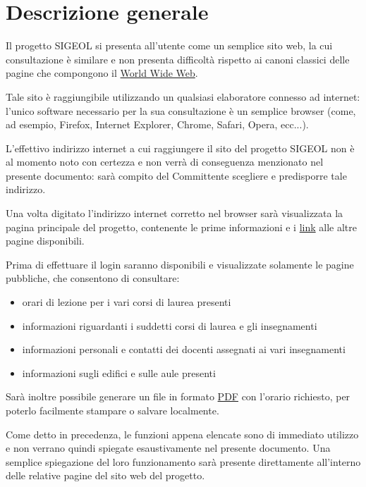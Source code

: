 \documentclass[11pt,a4paper]{article}
\begin{document}
\section{Descrizione generale}
Il progetto SIGEOL si presenta all'utente come un semplice sito web, la cui consultazione è similare e non presenta difficoltà rispetto ai canoni classici delle pagine che compongono il \underline{World Wide Web}.

Tale sito è raggiungibile utilizzando un qualsiasi elaboratore connesso ad internet: l'unico software necessario per la sua consultazione è un semplice browser (come, ad esempio, Firefox, Internet Explorer, Chrome, Safari, Opera, ecc...).

L'effettivo indirizzo internet a cui raggiungere il sito del progetto SIGEOL non è al momento noto con certezza e non verrà di conseguenza menzionato nel presente documento: sarà compito del Committente scegliere e predisporre tale indirizzo.

Una volta digitato l'indirizzo internet corretto nel browser sarà visualizzata la pagina principale del progetto, contenente le prime informazioni e i \underline{link} alle altre pagine disponibili.

Prima di effettuare il login saranno disponibili e visualizzate solamente le pagine pubbliche, che consentono di consultare:
\begin{itemize}
 \item orari di lezione per i vari corsi di laurea presenti
 \item informazioni riguardanti i suddetti corsi di laurea e gli insegnamenti
 \item informazioni personali e contatti dei docenti assegnati ai vari insegnamenti
 \item informazioni sugli edifici e sulle aule presenti
\end{itemize}
Sarà inoltre possibile generare un file in formato \underline{PDF} con l'orario richiesto, per poterlo facilmente stampare o salvare localmente.

Come detto in precedenza, le funzioni appena elencate sono di immediato utilizzo e non verrano quindi spiegate esaustivamente nel presente documento.
Una semplice spiegazione del loro funzionamento sarà presente direttamente all'interno delle relative pagine del sito web del progetto.
\end{document}
